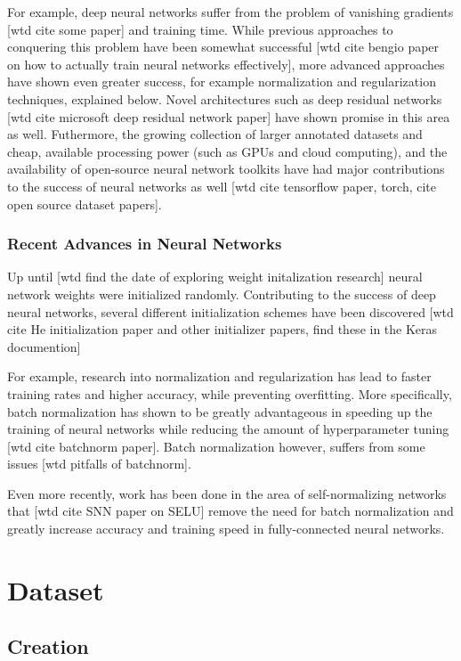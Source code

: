 For example, deep neural networks suffer from the problem of vanishing gradients [wtd cite some paper] and training time.  While previous approaches to conquering this problem have been somewhat successful [wtd cite bengio paper on how to actually train neural networks effectively], more advanced approaches have shown even greater success, for example normalization and regularization techniques, explained below.  Novel architectures such as deep residual networks [wtd cite microsoft deep residual network paper] have shown promise in this area as well.  Futhermore, the growing collection of larger annotated datasets and cheap, available processing power (such as GPUs and cloud computing), and the availability of open-source neural network toolkits have had major contributions to the success of neural networks as well [wtd cite tensorflow paper, torch, cite open source dataset papers].

\subsection{Recent Advances in Neural Networks}

Up until [wtd find the date of exploring weight initalization research] neural network weights were initialized randomly.  Contributing to the success of deep neural networks, several different initialization schemes have been discovered [wtd cite He initialization paper and other initializer papers, find these in the Keras documention]

For example, research into normalization and regularization has lead to faster training rates and higher accuracy, while preventing overfitting.  More specifically, batch normalization has shown to be greatly advantageous in speeding up the training of neural networks while reducing the amount of hyperparameter tuning [wtd cite batchnorm paper].  Batch normalization however, suffers from some issues [wtd pitfalls of batchnorm].

Even more recently, work has been done in the area of self-normalizing networks that [wtd cite SNN paper on SELU] remove the need for batch normalization and greatly increase accuracy and training speed in fully-connected neural networks.

\chapter{Dataset}

\section{Creation}

